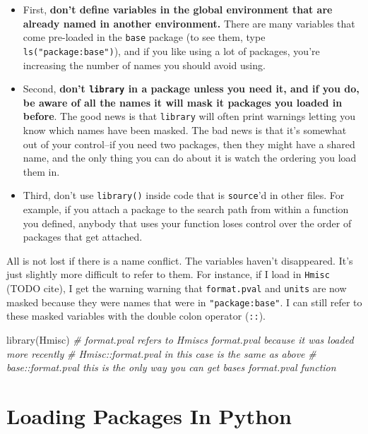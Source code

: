 \documentclass[
  12pt,
]{krantz}
\makeatletter
\newenvironment{Shaded}{\begin{snugshade}}{\end{snugshade}}
\newcommand{\CommentTok}[1]{\textcolor[rgb]{0.37,0.37,0.37}{\textit{#1}}}
\newcommand{\FunctionTok}[1]{\textcolor[rgb]{0,0,0}{#1}}
\newcommand{\NormalTok}[1]{#1}
\newenvironment{kframe}{%
\medskip{}
\setlength{\fboxsep}{.8em}
 \def\at@end@of@kframe{}%
 \ifinner\ifhmode%
  \def\at@end@of@kframe{\end{minipage}}%
  \begin{minipage}{\columnwidth}%
 \fi\fi%
 \def\FrameCommand##1{\hskip\@totalleftmargin \hskip-\fboxsep
 \colorbox{shadecolor}{##1}\hskip-\fboxsep
     \hskip-\linewidth \hskip-\@totalleftmargin \hskip\columnwidth}%
 \MakeFramed {\advance\hsize-\width
   \@totalleftmargin\z@ \linewidth\hsize
   \@setminipage}}%
 {\par\unskip\endMakeFramed%
 \at@end@of@kframe}
\renewenvironment{Shaded}{\begin{kframe}}{\end{kframe}}
\makeatother
\begin{document}
\begin{itemize}
\item
  First, \textbf{don't define variables in the global environment that are already named in another environment.} There are many variables that come pre-loaded in the \texttt{base} package (to see them, type \texttt{ls("package:base")}), and if you like using a lot of packages, you're increasing the number of names you should avoid using.
\item
  Second, \textbf{don't \texttt{library} in a package unless you need it, and if you do, be aware of all the names it will mask it packages you loaded in before}. The good news is that \texttt{library} will often print warnings letting you know which names have been masked. The bad news is that it's somewhat out of your control--if you need two packages, then they might have a shared name, and the only thing you can do about it is watch the ordering you load them in.
\item
  Third, don't use \texttt{library()} inside code that is \texttt{source}'d in other files. For example, if you attach a package to the search path from within a function you defined, anybody that uses your function loses control over the order of packages that get attached.
\end{itemize}

All is not lost if there is a name conflict. The variables haven't disappeared. It's just slightly more difficult to refer to them. For instance, if I load in \texttt{Hmisc} (TODO cite), I get the warning warning that \texttt{format.pval} and \texttt{units} are now masked because they were names that were in \texttt{"package:base"}. I can still refer to these masked variables with the double colon operator (\texttt{::}).

\begin{Shaded}
\begin{Highlighting}[]
\FunctionTok{library}\NormalTok{(Hmisc)}
\CommentTok{\# format.pval refers to Hmisc\textquotesingle{}s format.pval because it was loaded more recently}
\CommentTok{\# Hmisc::format.pval in this case is the same as above}
\CommentTok{\# base::format.pval this is the only way you can get base\textquotesingle{}s format.pval function}
\end{Highlighting}
\end{Shaded}

\hypertarget{loading-packages-in-python}{%
\section{Loading Packages In Python}\label{loading-packages-in-python}}
\end{document}
